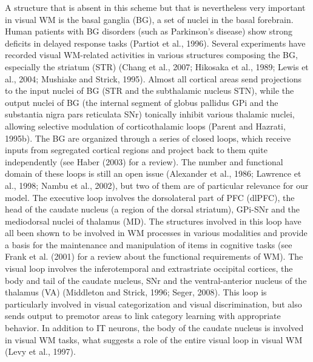 \documentclass[
  11pt,
  a4paper,
]{scrbook}
\begin{document}
A structure that is absent in this scheme but that is nevertheless very
important in visual WM is the basal ganglia (BG), a set of nuclei in the
basal forebrain. Human patients with BG disorders (such as Parkinson's
disease) show strong deficits in delayed response tasks (Partiot et al.,
1996). Several experiments have recorded visual WM-related activities in
various structures composing the BG, especially the striatum (STR)
(Chang et al., 2007; Hikosaka et al., 1989; Lewis et al., 2004; Mushiake
and Strick, 1995). Almost all cortical areas send projections to the
input nuclei of BG (STR and the subthalamic nucleus STN), while the
output nuclei of BG (the internal segment of globus pallidus GPi and the
substantia nigra pars reticulata SNr) tonically inhibit various thalamic
nuclei, allowing selective modulation of corticothalamic loops (Parent
and Hazrati, 1995b). The BG are organized through a series of closed
loops, which receive inputs from segregated cortical regions and project
back to them quite independently (see Haber (2003) for a review). The
number and functional domain of these loops is still an open issue
(Alexander et al., 1986; Lawrence et al., 1998; Nambu et al., 2002), but
two of them are of particular relevance for our model. The executive
loop involves the dorsolateral part of PFC (dlPFC), the head of the
caudate nucleus (a region of the dorsal striatum), GPi-SNr and the
mediodorsal nuclei of thalamus (MD). The structures involved in this
loop have all been shown to be involved in WM processes in various
modalities and provide a basis for the maintenance and manipulation of
items in cognitive tasks (see Frank et al. (2001) for a review about the
functional requirements of WM). The visual loop involves the
inferotemporal and extrastriate occipital cortices, the body and tail of
the caudate nucleus, SNr and the ventral-anterior nucleus of the
thalamus (VA) (Middleton and Strick, 1996; Seger, 2008). This loop is
particularly involved in visual categorization and visual
discrimination, but also sends output to premotor areas to link category
learning with appropriate behavior. In addition to IT neurons, the body
of the caudate nucleus is involved in visual WM tasks, what suggests a
role of the entire visual loop in visual WM (Levy et al., 1997).
\end{document}
